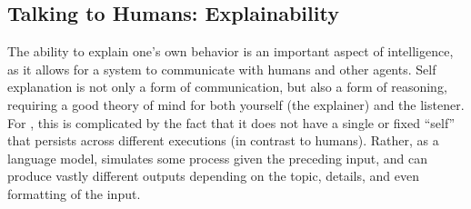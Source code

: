 


\subsection{Talking to Humans: Explainability} \label{sec:explainability}
The ability to explain one's own behavior is an important aspect of intelligence, as it allows for a system to communicate with humans and other agents.
Self explanation is not only a form of communication, but also a form of reasoning, requiring a good theory of mind for both yourself (the explainer) and the listener. 
For {\DV}, this is complicated by the fact that it does not have a single or fixed ``self'' that persists across different executions (in contrast to humans).
Rather, as a language model, {\DV} simulates some process given the preceding input, and can produce vastly different outputs depending on the topic, details, and even formatting of the input.




